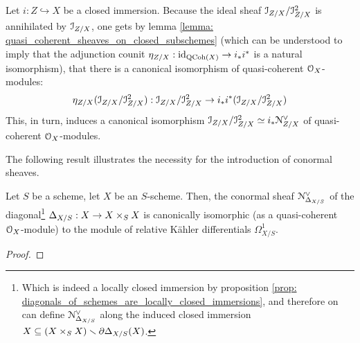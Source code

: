             \begin{remark}
                Let $i: Z \hookrightarrow X$ be a closed immersion. Because the ideal sheaf $\mathcal{I}_{Z/X}/\mathcal{I}_{Z/X}^2$ is annihilated by $\mathcal{I}_{Z/X}$, one gets by lemma \ref{lemma: quasi_coherent_sheaves_on_closed_subschemes} (which can be understood to imply that the adjunction counit $\eta_{Z/X}: \mathrm{id}_{\mathrm{QCoh}(X)} \to i_*i^*$ is a natural isomorphism), that there is a canonical isomorphism of quasi-coherent $\mathcal{O}_X$-modules:
                    $$\eta_{Z/X}(\mathcal{I}_{Z/X}/\mathcal{I}_{Z/X}^2): \mathcal{I}_{Z/X}/\mathcal{I}_{Z/X}^2 \to i_*i^*(\mathcal{I}_{Z/X}/\mathcal{I}_{Z/X}^2)$$
                This, in turn, induces a canonical isomorphism $\mathcal{I}_{Z/X}/\mathcal{I}_{Z/X}^2 \simeq i_*\mathcal{N}_{Z/X}^{\vee}$ of quasi-coherent $\mathcal{O}_X$-modules.
            \end{remark}
            The following result illustrates the necessity for the introduction of conormal sheaves. 
            \begin{proposition} \label{prop: conormal_sheaves_of_diagonals}
                \cite[\href{https://stacks.math.columbia.edu/tag/08S2}{Tag 08S2}]{stacks} Let $S$ be a scheme, let $X$ be an $S$-scheme. Then, the conormal sheaf $\mathcal{N}_{\Delta_{X/S}}^{\vee}$ of the diagonal\footnote{Which is indeed a locally closed immersion by proposition \ref{prop: diagonals_of_schemes_are_locally_closed_immersions}, and therefore on can define $\mathcal{N}_{\Delta_{X/S}}^{\vee}$ along the induced closed immersion $X \subseteq (X \x_S X) \setminus \del \Delta_{X/S}(X)$.} $\Delta_{X/S}: X \to X \x_S X$ is canonically isomorphic (as a quasi-coherent $\mathcal{O}_X$-module) to the module of relative K\"ahler differentials $\Omega^1_{X/S}$.
            \end{proposition}
                \begin{proof}
                    
                \end{proof}
